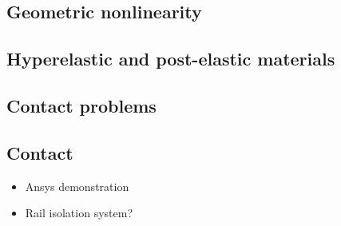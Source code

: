 \documentclass[12pt]{article}
\begin{document}
\subsection{Geometric nonlinearity}
\subsection{Hyperelastic and post-elastic materials}
\subsection{Contact problems}
\subsection*{Contact}
\begin{itemize}
    \item Ansys demonstration
    \item Rail isolation system?
\end{itemize}
\end{document}
